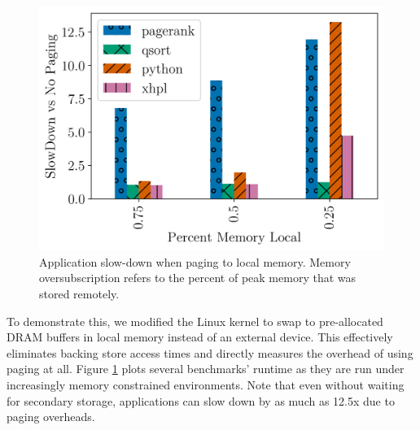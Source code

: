 \begin{figure}[h]
    \centering
    \includegraphics[width=0.9\columnwidth]{figs/paging_overhead.png}
    \caption{Application slow-down when paging to local memory. Memory
oversubscription refers to the percent of peak memory that was stored remotely.}
    \label{fig:paging_overhead}
\end{figure}

To demonstrate this, we modified the Linux kernel to swap to pre-allocated DRAM
buffers in local memory instead of an external device. This effectively
eliminates backing store access times and directly measures the overhead of
using paging at all. Figure \ref{fig:paging_overhead} plots several benchmarks'
runtime as they are run under increasingly memory constrained environments.
Note that even without waiting for secondary storage, applications can slow
down by as much as 12.5x due to paging overheads.

